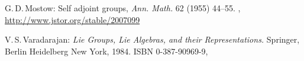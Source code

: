 \begin{references}{9}
  G.\,D.\,Mostow: 
 Self adjoint groups,
 \emph{Ann. Math.} 62 (1955) 44--55.
 ,
 \maynewline
 \url{http://www.jstor.org/stable/2007099}


 V.\,S.\,Varadarajan: 
 \emph{Lie Groups, Lie Algebras, and their Representations.}
 Springer, {Berlin Heidelberg New York}, 1984. 
 ISBN 0-387-90969-9,



 \end{references}





